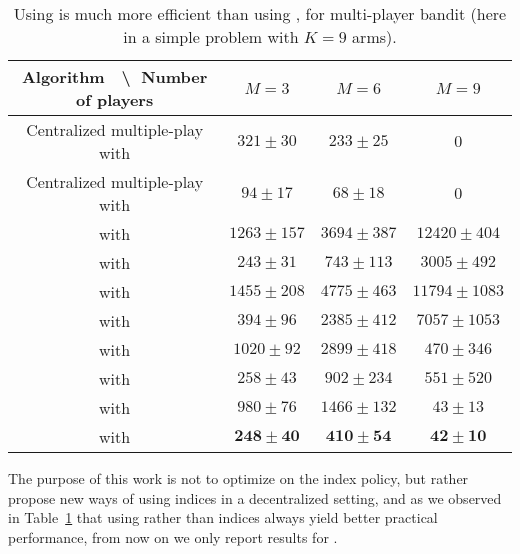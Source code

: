 %
\begin{table}[ht]
      \centering
      \begin{tabular}{c|ccc}
      \textbf{Algorithm} $\;$ \textbackslash $\;$ Number of players & $M=3$ & $M=6$ & $M=9$ \\
          \hline
          Centralized multiple-play with \UCB{} & $321 \pm 30$ & $233 \pm 25$ & $0$ \\
          Centralized multiple-play with \klUCB{} & $94 \pm 17$ & $68 \pm 18$ & $0$ \\
          \hline
          \Selfish{} with \UCB{} & $1263 \pm 157$ & $3694 \pm 387$ & $12420 \pm 404$ \\
          \Selfish{} with \klUCB{} & $243 \pm 31$ & $743 \pm 113$ & $3005 \pm 492$ \\
          \hline
          \RhoRand{} with \UCB{} & $1455 \pm 208$ & $4775 \pm 463$ & $11794 \pm 1083$ \\
          \RhoRand{} with \klUCB{} & $394 \pm 96$ & $2385 \pm 412$ & $7057 \pm 1053$ \\
          \hline
          \RandTopM{} with \UCB{} & $1020 \pm 92$ & $2899 \pm 418$ & $470 \pm 346$ \\
          \RandTopM{} with \klUCB{} & $258 \pm 43$ & $902 \pm 234$ & $551 \pm 520$ \\
          \hline
          \MCTopM{} with \UCB{} & $980 \pm 76$ & $1466 \pm 132$ & $43 \pm 13$ \\
          \MCTopM{} with \klUCB{} & $\mathbf{248 \pm 40}$ & $\mathbf{410 \pm 54}$ & $\mathbf{42 \pm 10}$ \\
          \hline
      \end{tabular}
      \caption{Using \klUCB{} is much more efficient than using \UCB{}, for multi-player bandit (here in a simple problem with $K=9$ arms).}
      \label{table:5:comparisonUCB_klUCB}
  \end{table}


The purpose of this work is not to optimize on the index policy, but rather propose new ways of using indices in a decentralized setting,
and as we observed in Table~\ref{table:5:comparisonUCB_klUCB} that using \klUCB{} rather than \UCB{} indices always yield better practical performance,
from now on we only report results for \klUCB.

